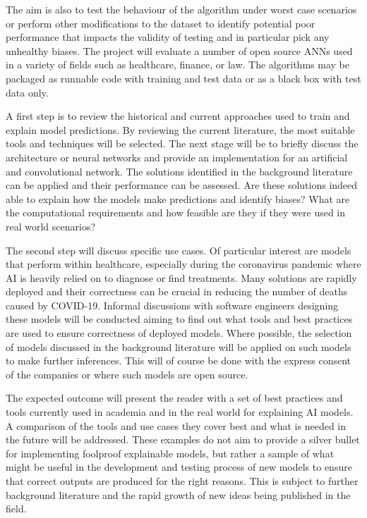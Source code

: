 \documentclass[proposal]{softeng}
\begin{document}
The aim is also to test the behaviour of the algorithm under worst case scenarios or perform other modifications to the dataset to identify potential poor performance that impacts the validity of testing and in particular pick any unhealthy biases. The project will evaluate a number of open source ANNs used in a variety of fields such as healthcare, finance, or law. The algorithms may be packaged as runnable code with training and test data or as a black box with test data only. 

A first step is to review the historical and current approaches used to train and explain model predictions. By reviewing the current literature, the most suitable tools and techniques will be selected. The next stage will be to briefly discuss the architecture or neural networks and provide an implementation for an artificial and convolutional network. The solutions identified in the background literature can be applied and their performance can be assessed. Are these solutions indeed able to explain how the models make predictions and identify biases? What are the computational requirements and how feasible are they if they were used in real world scenarios?

The second step will discuss specific use cases. Of particular interest are models that perform within healthcare, especially during the coronavirus pandemic where AI is heavily relied on to diagnose or find treatments. Many solutions are rapidly deployed and their correctness can be crucial in reducing the number of deaths caused by COVID-19. Informal discussions with software engineers designing these models will be conducted aiming to find out what tools and best practices are used to ensure correctness of deployed models. Where possible, the selection of models discussed in the background literature will be applied on such models to make further inferences. This will of course be done with the express consent of the companies or where such models are open source.

The expected outcome will present the reader with a set of best practices and tools currently used in academia and in the real world for explaining AI models. A comparison of the tools and use cases they cover best and what is needed in the future will be addressed. These examples do not aim to provide a silver bullet for implementing foolproof explainable models, but rather a sample of what might be useful in the development and testing process of new models to ensure that correct outputs are produced for the right reasons. This is subject to further background literature and the rapid growth of new ideas being published in the field.
\end{document}
